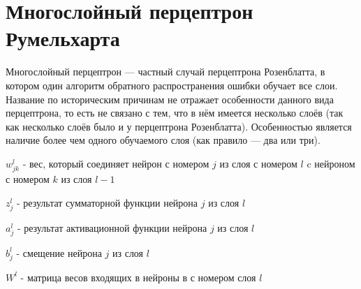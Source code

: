 \section{Многослойный перцептрон Румельхарта}

Многослойный перцептрон — частный случай перцептрона Розенблатта, в котором один алгоритм обратного распространения ошибки обучает все слои. Название по историческим причинам не отражает особенности данного вида перцептрона, то есть не связано с тем, что в нём имеется несколько слоёв (так как несколько слоёв было и у перцептрона Розенблатта). Особенностью является наличие более чем одного обучаемого слоя (как правило — два или три). 

$w_{jk}^l$ - вес, который соединяет нейрон с номером $j$ из слоя с номером $l$ c нейроном с номером $k$ из слоя $l-1$

$z_j^l$ - результат сумматорной функции нейрона $j$ из слоя $l$

$a_j^l$ - результат активационной функции нейрона $j$ из слоя $l$

$b_j^l$ - смещение нейрона $j$ из слоя $l$

$W^l$ - матрица весов входящих в нейроны в с номером слоя $l$